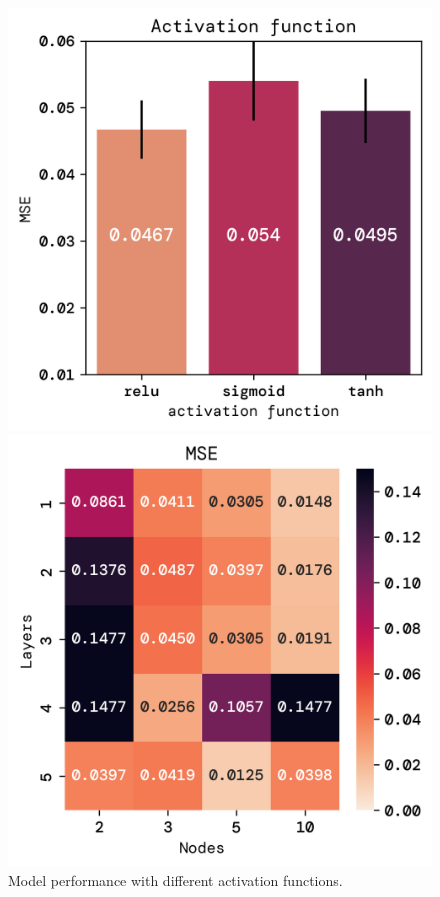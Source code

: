 \documentclass[twoside,11pt]{report}
\begin{document}
    \begin{figure}[!ht]
        \begin{minipage}[t]{0.5\textwidth - 1mm}
            \begin{center}
                \includegraphics[width=\textwidth]{../runsAndFigures/MSE_activs.png}
            \end{center}
            \caption
            {
                Model performance with different activation functions.
            }\label{fig:MSE_activ}
        \end{minipage}
        \hspace{2mm}
        \begin{minipage}[t]{0.5\textwidth - 1mm}
            \begin{center}
                \includegraphics[width=\textwidth]{../runsAndFigures/MSE_layers_nodes.png}

\end{center}
\end{minipage}
\end{figure}
\end{document}
